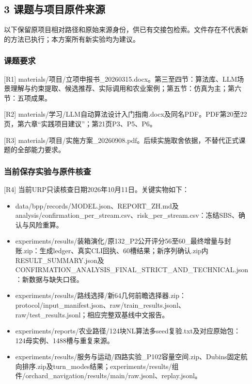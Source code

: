 \documentclass[11pt,a4paper]{article}
\newcommand{\bodytext}[1]{#1\par}
\begin{document}
\endgroup
\subsection{3  课题与项目原件来源}
\bodytext{以下保留原项目相对路径和原始来源身份，供已有交接包检索。文件存在不代表新的方法已执行；本方案所有新实验均为建议。}
\subsubsection{课题要求}
\bodytext{[R1] materials/\allowbreak{}项目/\allowbreak{}立项申报书\_\allowbreak{}20260315.docx。第三至四节：算法库、LLM场景理解与约束提取、候选推荐、实际调用和农业案例；第五节：仿真为主；第六节：五项成果。}
\bodytext{[R2] materials/\allowbreak{}学习/\allowbreak{}LLM自动算法设计入门指南.docx及同名PDF。PDF第20至22页，第六章“实践项目建议”；第21页P3、P5、P6。}
\bodytext{[R3] materials/\allowbreak{}项目/\allowbreak{}实施方案\_\allowbreak{}20260908.pdf。后续实施取舍依据，不替代正式课题的全部能力要求。}
\subsubsection{当前保存实验与原件核查}
\bodytext{[R4] 当前URP只读核查日期2026年10月11日。关键实物如下：}
\begin{itemize}
\item data/\allowbreak{}bpp/\allowbreak{}records/\allowbreak{}MODEL.json、REPORT\_\allowbreak{}ZH.md及analysis/\allowbreak{}confirmation\_\allowbreak{}per\_\allowbreak{}stream.csv、risk\_\allowbreak{}per\_\allowbreak{}stream.csv：冻结SBS、确认与风险重算。
\item experiments/\allowbreak{}results/\allowbreak{}装箱演化/\allowbreak{}原132\_\allowbreak{}P2公开评分56至60\_\allowbreak{}最终增量与封账.zip：生成ledger、真实CLI回执、60槽结果；新序列确认.zip内RESULT\_\allowbreak{}SUMMARY.json及CONFIRMATION\_\allowbreak{}ANALYSIS\_\allowbreak{}FINAL\_\allowbreak{}STRICT\_\allowbreak{}AND\_\allowbreak{}TECHNICAL.json：新数据与缺失口径。
\item experiments/\allowbreak{}results/\allowbreak{}路线选择/\allowbreak{}新64几何前瞻选择器.zip：protocol/\allowbreak{}input\_\allowbreak{}manifest.json、raw/\allowbreak{}train\_\allowbreak{}results.jsonl、raw/\allowbreak{}test\_\allowbreak{}results.jsonl；相应完整双基线中文报告。
\item experiments/\allowbreak{}reports/\allowbreak{}农业路径/\allowbreak{}124块NL算法多seed复验.txt及对应原始包：124母实例、1488槽与重复来源。
\item experiments/\allowbreak{}results/\allowbreak{}服务与运动/\allowbreak{}四路实验\_\allowbreak{}P102容量空间.zip、Dubins固定航向排序.zip及turn\_\allowbreak{}modes结果；experiments/\allowbreak{}results/\allowbreak{}组件/\allowbreak{}orchard\_\allowbreak{}navigation/\allowbreak{}results/\allowbreak{}main/\allowbreak{}raw.jsonl、replay.jsonl。
\end{itemize}
\end{document}
